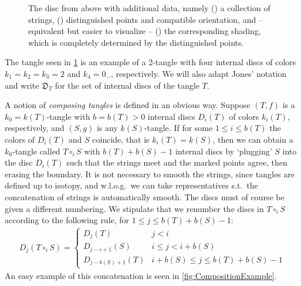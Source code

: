 \begin{figure}[!htp]
\begin{subfigure}{.49\textwidth}
		\caption[]{}
		\label{fig:DiscWithShading}
	\end{subfigure}
	\caption[Construction of a shaded tangle]{The disc from above with additional data, namely
		() a collection of strings,
		() distinguished points and compatible orientation, and -- equivalent but easier to visualize --
		() the corresponding shading, which is completely determined by the distinguished points.}
		\label{fig:Disc2Tangle}
\end{figure}

The tangle seen in \ref{fig:DiscWithShading} is an example of a 2-tangle with four internal discs of colors $k_1=k_2=k_3=2$ and $k_4=0_-$, respectively. We will also adapt Jones' notation and write $\mathfrak{D}_T$ for the set of internal discs of the tangle $T$.

\bigno A notion of \emph{composing tangles} is defined in an obvious way. Suppose $(T,f)$ is a $k_0=k(T)$-tangle with $b=b(T)>0$ internal discs $D_i(T)$ of colors $k_i(T)$, respectively, and $(S,g)$ is any $k(S)$-tangle. If for some $1\leq i \leq b(T)$ the colors of $D_i(T)$ and $S$ coincide, that is $k_i(T)=k(S)$, then we can obtain a $k_0$-tangle called $T\circ_i S$ with $b(T)+b(S)-1$ internal discs by `plugging' $S$ into the disc $D_i(T)$ such that the strings meet and the marked points agree, then erasing the boundary. It is not necessary to smooth the strings, since tangles are defined up to isotopy, and w.l.o.g.\ we can take representatives s.t.\ the concatenation of strings is automatically smooth. The discs must of course be given a different numbering. We stipulate that we renumber the discs in $T\circ_i S$ according to the following rule, for $1 \leq j \leq b(T)+b(S)-1$:
\begin{align}\label{eq:CompositionInternalDiscs}
D_{j}(T\circ_i S)=
\begin{cases}
D_j(T) & j < i \\
D_{j-i+1}(S) & i\leq j < i+b(S)\\
D_{j-b(S)+1}(T) & i+b(S)\leq j \leq b(T)+b(S) -1
\end{cases}
\end{align}
An easy example of this concatenation is seen in \ref{fig:CompositionExample}.

